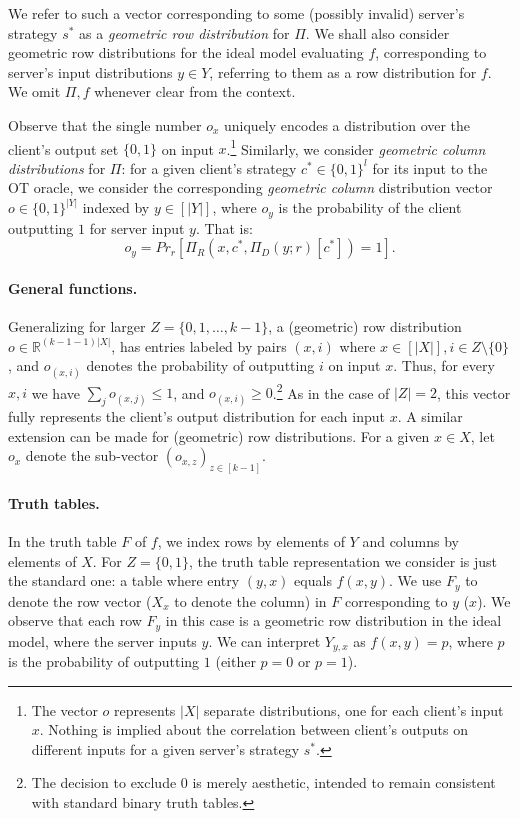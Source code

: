 \documentclass[a4paper]{article}
\begin{document}
We refer to such a vector corresponding to some (possibly invalid) server's strategy $s^*$ as a \emph{geometric row distribution} for $\Pi$. 
We shall also consider geometric row distributions for the ideal model evaluating $f$, corresponding to server's input distributions $y\in Y$, referring to them as a row distribution for $f$. We omit $\Pi,f$ whenever clear from the context.

Observe that the single number $o_x$ uniquely encodes a distribution over the client's output set $\{0,1\}$ on input $x$.\footnote{The vector $o$ represents $|X|$ separate distributions, one for each client's input $x$. Nothing is implied about the correlation between client's outputs on different inputs for a given server's strategy $s^*$.} Similarly, we consider \emph{geometric column distributions} for $\Pi$: for a given client's strategy $c^*\in\{0,1\}^l$ for its input to the OT oracle, we consider the corresponding \emph{geometric column} distribution vector $o\in \{0,1\}^{|Y|}$ indexed by  $y\in [|Y|]$, where $o_y$ is the probability of the client outputting $1$ for server input $y$. That is:
\[o_y = Pr_r[\Pi_R(x,c^*,\Pi_D(y;r)[c^*])=1].\]

\paragraph{General functions.} Generalizing for larger $Z=\{0,1,\ldots,k-1\}$, a (geometric) row distribution $o\in \mathbb{R}^{(k-1-1)|X|}$, has entries labeled by
pairs $(x,i)$ where $x\in [|X|],i\in Z\setminus{\{0\}}$, and $o_{(x,i)}$ denotes the probability of outputting $i$ on input $x$. Thus, for every $x,i$ we have $\sum_j o_{(x,j)}\leq 1$, and $o_{(x,i)}\geq 0$.\footnote{The decision to exclude 0 is merely aesthetic, intended to remain consistent with standard binary truth tables.}
As in the case of $|Z|=2$, this vector fully represents the client's output distribution for each input $x$. A similar extension can be made for (geometric) row distributions. For a given $x\in X$, let $o_x$ denote the sub-vector $(o_{x,z})_{z\in [k-1]}$.

\paragraph{Truth tables.} In the truth table $F$ of $f$, we index rows by elements of $Y$ and columns by elements of $X$. For $Z=\{0,1\}$, the truth table representation we consider is just the standard one: a table where entry $(y,x)$ equals $f(x,y)$. We use $F_y$ to denote the row vector ($X_x$ to denote the column) in $F$ corresponding to $y$ ($x$).
We observe that each row $F_y$ in this case is a geometric row distribution in the ideal model, where the server inputs $y$. We can interpret $Y_{y,x}$ as $f(x,y) = p$, where $p$ is the probability of outputting $1$ (either $p=0$ or $p=1$). 
\end{document}
